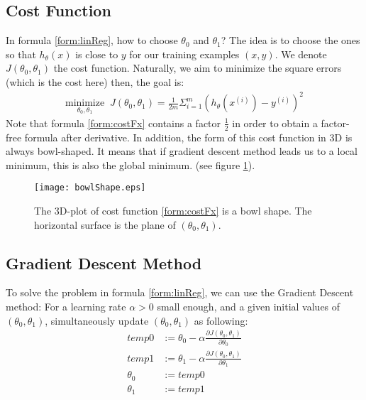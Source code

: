 \subsection{Cost Function}
In formula \eqref{form:linReg}, how to choose $\theta_0$ and $\theta_1$? The idea is to choose the ones so that $h_{\theta}(x)$ is close to $y$ for our training examples $(x, y)$. We denote $J(\theta_0, \theta_1)$ the cost function. Naturally, we aim to minimize the square errors (which is the cost here) then, the goal is:
\begin{align}
\underset{\theta_0, \theta_1}{\text{minimize}} \; \; J(\theta_0, \theta_1) = \frac{1}{2m}\Sigma_{i = 1}^{m} (h_{\theta}(x^{(i)}) - y^{(i)})^2
\label{form:costFx}
\end{align}
Note that formula \eqref{form:costFx} contains a factor $\frac{1}{2}$ in order to obtain a factor-free formula after derivative. In addition, the form of this cost function in 3D is always bowl-shaped. It means that if gradient descent method leads us to a local minimum, this is also the global minimum. (see figure \ref{fig:bowlShape}).  
\begin{figure}[!ht]
\centering
\texttt{[image: bowlShape.eps]}
\caption[Cost Function Shape]{The 3D-plot of cost function \eqref{form:costFx} is a bowl shape. The horizontal surface is the plane of $(\theta_0, \theta_1)$.}
\label{fig:bowlShape}
\end{figure}

\subsection{Gradient Descent Method}
To solve the problem in formula \eqref{form:linReg}, we can use the Gradient Descent method: For a learning rate $\alpha > 0$ small enough, and a given initial values of $(\theta_0, \theta_1)$, simultaneously update $(\theta_0, \theta_1)$ as following:
\begin{align}
\label{form:gradDesc}
temp0 &:= \theta_0 - \alpha \frac{\partial J(\theta_0, \theta_1)}{\partial \theta_0} \nonumber \\
temp1 &:= \theta_1 - \alpha \frac{\partial J(\theta_0, \theta_1)}{\partial \theta_1} \\
\theta_0 &:= temp0 \nonumber\\
\theta_1 &:= temp1 \nonumber
\end{align}

